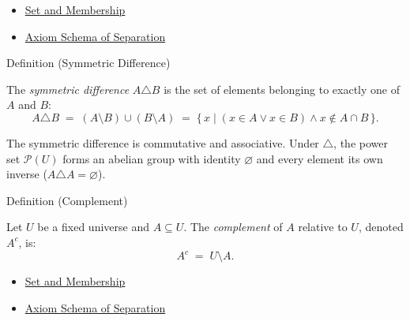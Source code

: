 \begin{dependencies}
\begin{itemize}
  \item \hyperref[def:set-membership]{Set and Membership}
  \item \hyperref[ax:separation]{Axiom Schema of Separation}
\end{itemize}
\end{dependencies}



\begin{definitionbox}{Definition (Symmetric Difference)}
\begin{definition}\label{def:sym-diff}
The \emph{symmetric difference} $A \triangle B$ is the set of elements
belonging to exactly one of $A$ and $B$:
\[
A \triangle B
\;=\;
(A \setminus B) \cup (B \setminus A)
\;=\;
\{\, x \mid (x \in A \lor x \in B) \land x \notin A \cap B \,\}.
\]
\end{definition}
\end{definitionbox}



\begin{remark*}
The symmetric difference is commutative and associative. Under $\triangle$,
the power set $\mathcal{P}(U)$ forms an abelian group with identity
$\varnothing$ and every element its own inverse ($A \triangle A = \varnothing$).
\end{remark*}

\begin{definitionbox}{Definition (Complement)}
\begin{definition}[Complement]\label{def:complement}
Let $U$ be a fixed universe and $A \subseteq U$. The \emph{complement} of $A$
relative to $U$, denoted $A^c$, is:
\[
A^c \;=\; U \setminus A.
\]
\end{definition}
\end{definitionbox}

\begin{dependencies}
\begin{itemize}
  \item \hyperref[def:set-membership]{Set and Membership}
  \item \hyperref[ax:separation]{Axiom Schema of Separation}
\end{itemize}
\end{dependencies}

